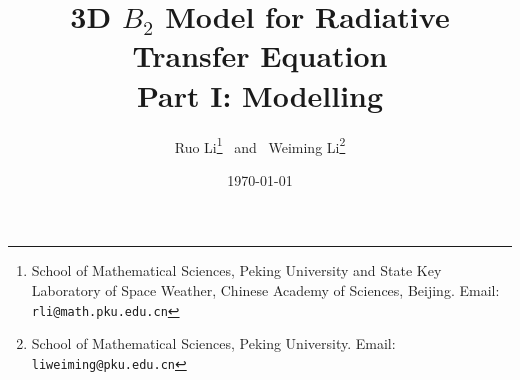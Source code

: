 \documentclass[10pt]{article}
\begin{document}
\title{ 3D $B_2$ Model for Radiative Transfer Equation \\ Part I:
  Modelling }

\author{Ruo Li\thanks{School of Mathematical Sciences, Peking
    University and State Key Laboratory of Space Weather, Chinese
    Academy of Sciences, Beijing. Email: \tt{rli@math.pku.edu.cn}}
  ~and~ Weiming Li\thanks{School of Mathematical Sciences, Peking
    University. Email: \tt{liweiming@pku.edu.cn}}}

\date{\today}

\maketitle













\end{document}

